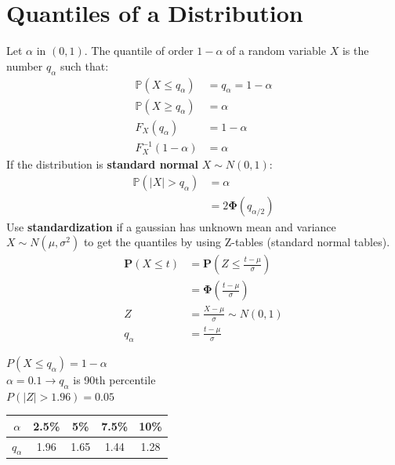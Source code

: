\section{Quantiles of a Distribution}

Let $\alpha$ in $(0,1)$. The quantile of order $1 - \alpha$ of a random variable $X$ is the number $q_{\alpha}$ such that:\\
\begin{align*}
\displaystyle \mathbb{P}\left(X\leq q_{\alpha }\right)& = q_{\alpha } = 1-\alpha\\
\mathbb{P}(X \geq q_{\alpha })& = \alpha\\
F_X(q_{\alpha})& = 1 - \alpha\\
F^{-1}_{X}(1-\alpha)&= \alpha
\end{align*}
If the distribution is \textbf{standard normal} $X \sim N(0,1)$:\\
\begin{align*}
\mathbb{P}(|X| > q_{\alpha})& = \alpha\\
& = 2\mathbf{\Phi}(q_{\alpha/2})
\end{align*}
Use \textbf{standardization} if a gaussian has unknown mean and variance $X \sim N(\mu,\sigma^2)$ to get the quantiles by using Z-tables (standard normal tables).\\

\begin{align*}
\mathbf{P}\left(X\leq t\right)& = \displaystyle \mathbf{P}\left(Z\leq \frac{t-\mu}{\sigma}\right)\\
& = \mathbf{\Phi}\left(\frac{t-\mu}{\sigma}\right)\\
Z &= \frac{X-\mu}{\sigma} \sim N(0,1)\\
q_{\alpha }& = \frac{t-\mu}{\sigma}
\end{align*}

$P(X \le q_{\alpha}) = 1 - \alpha$\\
$\alpha = 0.1 \rightarrow q_{\alpha}$ is 90th percentile\\
$P(|Z| > 1.96) = 0.05$\\[6pt]
\begin{tabular}{|c|c|c|c|c|}
\hline
$\alpha$ & 2.5\% & 5\% & 7.5\% & 10\% \\
\hline
$q_{\alpha}$ & 1.96 & 1.65 & 1.44 & 1.28 \\
\hline
\end{tabular}
